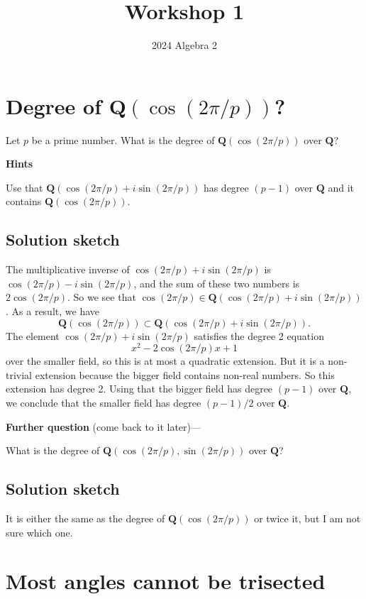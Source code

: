 \documentclass[12pt]{amsart}
\author{2024 Algebra 2}
\date{}
\title{Workshop 1}
\begin{document}
\maketitle
\section{Degree of \(\mathbf{Q}(\cos (2\pi/p))\)?}
\label{sec:orgb298dea}

\noindent
Let \(p\) be a prime number.
What is the degree of \(\mathbf{Q}(\cos (2\pi/p))\) over \(\mathbf{Q}\)?

\bigskip

\noindent
\textbf{\textbf{Hints}}

Use that \(\mathbf{Q}(\cos(2\pi/p) + i \sin(2\pi/p))\) has degree \((p-1)\) over \(\mathbf{Q}\) and it contains \(\mathbf{Q}(\cos(2\pi/p))\).
\subsection*{Solution sketch}
\label{sec:org64cfe7f}
The multiplicative inverse of \(\cos(2\pi/p) + i \sin(2\pi/p)\) is \(\cos(2\pi/p) - i \sin(2\pi/p)\), and the sum of these two numbers is \(2\cos(2\pi/p)\).
So we see that \(\cos(2\pi/p) \in \mathbf{Q}(\cos(2\pi/p) + i \sin(2\pi/p))\).
As a result, we have
\[ \mathbf{Q}(\cos(2\pi/p)) \subset \mathbf{Q}(\cos(2\pi/p) + i \sin(2\pi/p)).\]
The element \(\cos(2\pi/p) + i \sin(2\pi/p)\) satisfies the degree 2 equation
\[ x^2 - 2\cos(2\pi/p)x + 1\]
over the smaller field, so this is at most a quadratic extension.
But it is a non-trivial extension because the bigger field contains non-real numbers.
So this extension has degree 2.
Using that the bigger field has degree \((p-1)\) over \(\mathbf{Q}\), we conclude that the smaller field has degree \((p-1)/2\) over \(\mathbf{Q}\).

\textbf{\textbf{Further question}} (come back to it later)---

What is the degree of \(\mathbf{Q}(\cos (2\pi/p), \sin(2\pi/p))\) over \(\mathbf{Q}\)?
\subsection*{Solution sketch}
\label{sec:org3b9cf1c}
It is either the same as the degree of \(\mathbf{Q}(\cos (2\pi/p))\) or twice it, but I am not sure which one.
\section{Most angles cannot be trisected}
\label{sec:org2dd6588}
\end{document}
